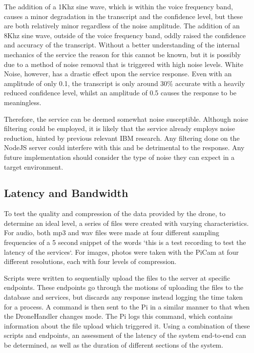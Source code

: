 \documentclass{article}
\begin{document}
The addition of a 1Khz sine wave, which is within the voice frequency band, causes a minor degradation in the transcript and the confidence level, but these are both relatively minor regardless of the noise amplitude. The addition of an 8Khz sine wave, outside of the voice frequency band, oddly raised the confidence and accuracy of the transcript. Without a better understanding of the internal mechanics of the service the reason for this cannot be known, but it is possibly due to a method of noise removal that is triggered with high noise levels. White Noise, however, has a drastic effect upon the service response. Even with an amplitude of only 0.1, the transcript is only around 30\% accurate with a heavily reduced confidence level, whilst an amplitude of 0.5 causes the response to be meaningless. 

Therefore, the service can be deemed somewhat noise susceptible. Although noise filtering could be employed, it is likely that the service already employs noise reduction, hinted by previous relevant IBM research\cite{ibmSpeech}. Any filtering done on the NodeJS server could interfere with this and be detrimental to the response. Any future implementation should consider the type of noise they can expect in a target environment.


\subsection{Latency and Bandwidth}\label{LatencyBandwidth}
To test the quality and compression of the data provided by the drone, to determine an ideal level, a series of files were created with varying characteristics. For audio, both mp3 and wav files were made at four different sampling frequencies of a 5 second snippet of the words `this is a test recording to test the latency of the services`. For images, photos were taken with the PiCam at four different resolutions, each with four levels of compression. 

Scripts were written to sequentially upload the files to the server at specific endpoints. These endpoints go through the motions of uploading the files to the database and services, but discards any response instead logging the time taken for a process. A command is then sent to the Pi in a similar manner to that when the DroneHandler changes mode. The Pi logs this command, which contains information about the file upload which triggered it. Using a combination of these scripts and endpoints, an assessment of the latency of the system end-to-end can be determined, as well as the duration of different sections of the system. 
\end{document}
